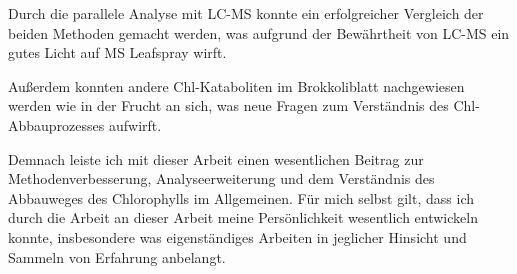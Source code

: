 Durch die parallele Analyse mit LC-MS konnte ein erfolgreicher Vergleich der beiden Methoden gemacht werden, was aufgrund der Bewährtheit von LC-MS ein gutes Licht auf MS Leafspray wirft.

Außerdem konnten andere Chl-Kataboliten im Brokkoliblatt nachgewiesen werden wie in der Frucht an sich, was neue Fragen zum Verständnis des Chl-Abbauprozesses aufwirft.

Demnach leiste ich mit dieser Arbeit einen wesentlichen Beitrag zur Methodenverbesserung, Analyseerweiterung und dem Verständnis des Abbauweges des Chlorophylls im Allgemeinen. Für mich selbst gilt, dass ich durch die Arbeit an dieser Arbeit meine Persönlichkeit wesentlich entwickeln konnte, insbesondere was eigenständiges Arbeiten in jeglicher Hinsicht und Sammeln von Erfahrung anbelangt. 

